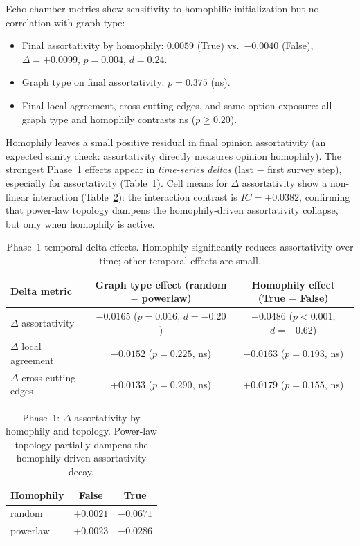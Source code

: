 \documentclass[11pt]{article}
\begin{document}
Echo-chamber metrics show sensitivity to homophilic initialization but no correlation with graph type:
\begin{itemize}
    \item Final assortativity by homophily: $0.0059$ (True) vs.\ $-0.0040$ (False), $\Delta = +0.0099$, $p = 0.004$, $d = 0.24$.
    \item Graph type on final assortativity: $p = 0.375$ (ns).
    \item Final local agreement, cross-cutting edges, and same-option exposure: all graph type and homophily contrasts ns ($p \geq 0.20$).
\end{itemize}
Homophily leaves a small positive residual in final opinion assortativity (an expected sanity check: assortativity directly measures opinion homophily). The strongest Phase~1 effects appear in \textit{time-series deltas} (last $-$ first survey step), especially for assortativity (Table~\ref{tab:temporal_dynamics}). Cell means for $\Delta$ assortativity show a non-linear interaction (Table~\ref{tab:delta_assortativity_vs_homophily}): the interaction contrast is $IC = +0.0382$, confirming that power-law topology dampens the homophily-driven assortativity collapse, but only when homophily is active.

\begin{table}[h]
\centering
\begin{tabular}{lcc}
\toprule
Delta metric & Graph type effect (random $-$ powerlaw) & Homophily effect (True $-$ False) \\
\midrule
$\Delta$ assortativity        & $-0.0165$ ($p = 0.016$, $d = -0.20$) & $\mathbf{-0.0486}$ ($p < 0.001$, $d = -0.62$) \\
$\Delta$ local agreement      & $-0.0152$ ($p = 0.225$, ns)          & $-0.0163$ ($p = 0.193$, ns) \\
$\Delta$ cross-cutting edges  & $+0.0133$ ($p = 0.290$, ns)          & $+0.0179$ ($p = 0.155$, ns) \\
\bottomrule
\end{tabular}
\caption{Phase~1 temporal-delta effects. Homophily significantly reduces assortativity over time; other temporal effects are small.}
\label{tab:temporal_dynamics}
\end{table}

\begin{table}[h]
\centering
\begin{tabular}{lcc}
\toprule
Homophily & False & True \\
\midrule
random   & $+0.0021$ & $-0.0671$ \\
powerlaw & $+0.0023$ & $-0.0286$ \\
\bottomrule
\end{tabular}
\caption{Phase~1: $\Delta$ assortativity by homophily and topology. Power-law topology partially dampens the homophily-driven assortativity decay.}
\label{tab:delta_assortativity_vs_homophily}
\end{table}
\end{document}
